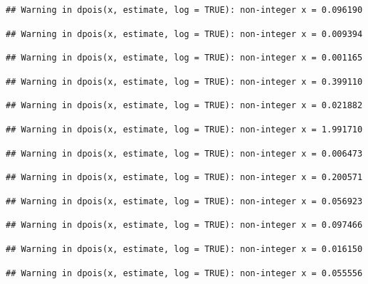 \documentclass[]{article}
\begin{document}
\begin{verbatim}
## Warning in dpois(x, estimate, log = TRUE): non-integer x = 0.096190
\end{verbatim}

\begin{verbatim}
## Warning in dpois(x, estimate, log = TRUE): non-integer x = 0.009394
\end{verbatim}

\begin{verbatim}
## Warning in dpois(x, estimate, log = TRUE): non-integer x = 0.001165
\end{verbatim}

\begin{verbatim}
## Warning in dpois(x, estimate, log = TRUE): non-integer x = 0.399110
\end{verbatim}

\begin{verbatim}
## Warning in dpois(x, estimate, log = TRUE): non-integer x = 0.021882
\end{verbatim}

\begin{verbatim}
## Warning in dpois(x, estimate, log = TRUE): non-integer x = 1.991710
\end{verbatim}

\begin{verbatim}
## Warning in dpois(x, estimate, log = TRUE): non-integer x = 0.006473
\end{verbatim}

\begin{verbatim}
## Warning in dpois(x, estimate, log = TRUE): non-integer x = 0.200571
\end{verbatim}

\begin{verbatim}
## Warning in dpois(x, estimate, log = TRUE): non-integer x = 0.056923
\end{verbatim}

\begin{verbatim}
## Warning in dpois(x, estimate, log = TRUE): non-integer x = 0.097466
\end{verbatim}

\begin{verbatim}
## Warning in dpois(x, estimate, log = TRUE): non-integer x = 0.016150
\end{verbatim}

\begin{verbatim}
## Warning in dpois(x, estimate, log = TRUE): non-integer x = 0.055556
\end{verbatim}
\end{document}
